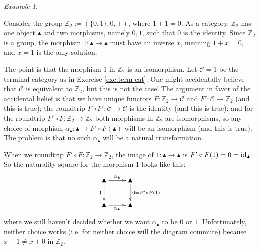 \documentclass{book}
\def\tn{\textnormal}
\def\mc{\mathcal}
\def\ZZ{{\mathbb Z}}
\def\to{\rightarrow}
\def\taking{\colon}
\def\ul{\underline}
\def\monOb{\blacktriangle}
\def\id{\tn{id}}
\def\mcC{\mc{C}}
\theoremstyle{remark}
\newtheorem{example}[subsubsection]{Example}
\theoremstyle{definition}
\begin{document}
\begin{example}\label{ex:Z1 not equiv Z2}

Consider the group $\ZZ_2:=(\{0,1\},0,+)$, where $1+1=0$. As a category, $\ZZ_2$ has one object $\monOb$ and two morphisms, namely $0,1$, such that $0$ is the identity. Since $\ZZ_2$ is a group, the morphism $1\taking\monOb\to\monOb$ must have an inverse $x$, meaning $1+x=0$, and $x=1$ is the only solution.

The point is that the morphism $1$ in $\ZZ_2$ is an isomorphism. Let $\mcC=\ul{1}$ be the terminal category as in Exercise \ref{exc:term cat}. One might accidentally believe that $\mcC$ is equivalent to $\ZZ_2$, but this is not the case! The argument in favor of the accidental belief is that we have unique functors $F\taking\ZZ_2\to\mcC$ and $F'\taking\mcC\to\ZZ_2$ (and this is true); the roundtrip $F\circ F'\taking\mcC\to\mcC$ is the identity (and this is true); and for the roundtrip $F'\circ F\taking\ZZ_2\to\ZZ_2$ both morphisms in $\ZZ_2$ are isomorphisms, so any choice of morphism $\alpha_\monOb\taking\monOb\to F'\circ F(\monOb)$ will be an isomorphism (and this is true). The problem is that no such $\alpha_\monOb$ will be a natural transformation.

When we roundtrip $F'\circ F\taking\ZZ_2\to\ZZ_2$, the image of $1\taking\monOb\to\monOb$ is $F'\circ F(1)=0=\id_{\monOb}$. So the naturality square for the morphism $1$ looks like this:
$$
\xymatrix{\monOb\ar[r]^{\alpha_\monOb}\ar[d]_{1}&\monOb\ar[d]^{0=F'\circ F(1)}\\\monOb\ar[r]_{\alpha_\monOb}&\monOb}
$$
where we still haven't decided whether we want $\alpha_\monOb$ to be $0$ or $1$. Unfortunately, neither choice works (i.e. for neither choice will the diagram commute) because $x+1\neq x+0$ in $\ZZ_2$.

\end{example}
\end{document}
